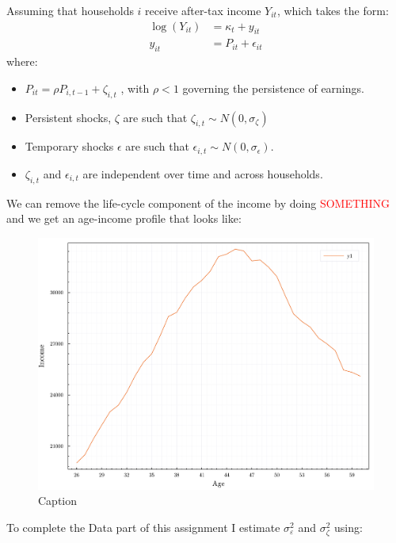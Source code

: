 \documentclass[12pt]{article}
\begin{document}
Assuming that households $i$ receive after-tax income $Y_{i t}$, which takes the form:
\begin{align*}
    \log \left(Y_{i t}\right) &=\kappa_{t}+y_{i t} \\
    y_{i t} &=P_{i t}+\epsilon_{i t}
\end{align*}
where:
\begin{itemize}
    \item $P_{i t}=\rho P_{i, t-1}+\zeta_{i, t}$ , with $\rho<1$ governing the persistence of earnings. 
    \item Persistent shocks, $\zeta$ are such that $\zeta_{i, t} \sim N\left(0, \sigma_{\zeta}\right)$
    \item Temporary shocks $\epsilon$ are such that  $\epsilon_{i, t} \sim N\left(0, \sigma_{\epsilon}\right)$. 
    \item $\zeta_{i, t}$ and $\epsilon_{i, t}$ are independent over time and across households.
\end{itemize}

We can remove the life-cycle component of the income by doing \textcolor{red}{SOMETHING} and we get an age-income profile that looks like:

\begin{figure}[h*]
    \centering
    \includegraphics[scale = .5]{04 - 2022 Fall/Econ 810 Advanded Macroeconomic Theory/Part 1/PS 1/document/figures/age_income_profile.pdf}
    \caption{Caption}
    \label{fig:my_label}
\end{figure}

To complete the Data part of this assignment I estimate $\sigma_\varepsilon^2$ and $\sigma_\zeta^2$ using:
\end{document}
